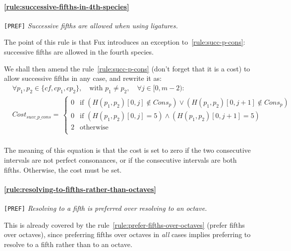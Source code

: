 \paragraph{\hspace{.6cm}\ref{rule:successive-fifths-in-4th-species}} \texttt{[PREF]} \textit{Successive fifths are allowed when using ligatures.}    

    The point of this rule is that Fux introduces an exception to~\ref{rule:succ-p-cons}: successive fifths are allowed in the fourth species.

    We shall then amend the rule~\ref{rule:succ-p-cons} (don't forget that it is a cost) to allow successive fifths in any case, and rewrite it as:
    \begin{equation} \begin{aligned}
        &\forall p_1, p_2 \in \{cf, cp_1, cp_2\}, \quad \text{with } p_1 \neq p_2, \quad \forall j \in [0, m-2) \colon\\
        &Cost_{succ\_p\_cons} = \,  
        \begin{cases}
            0 & \text{if } (H(p_1, p_2)[0, j] \notin Cons_p) \lor (H(p_1, p_2)[0, j+1] \notin Cons_p)\\
            0 & \text{if } (H(p_1, p_2)[0, j] = 5 ) \land (H(p_1, p_2)[0, j+1] = 5) \\
            2 & \text{otherwise } \\
        \end{cases}\\
    \end{aligned} \end{equation}

    The meaning of this equation is that the cost is set to zero if the two consecutive intervals are not perfect consonances, or if the consecutive intervals are both fifths. Otherwise, the cost must be set.

    \paragraph{\hspace{.6cm}\ref{rule:resolving-to-fifths-rather-than-octaves}} \texttt{[PREF]} \textit{Resolving to a fifth is preferred over resolving to an octave.}    
    
    This is already covered by the rule~\ref{rule:prefer-fifths-over-octaves} (prefer fifths over octaves), since preferring fifths over octaves in \textit{all} cases implies preferring to resolve to a fifth rather than to an octave.

